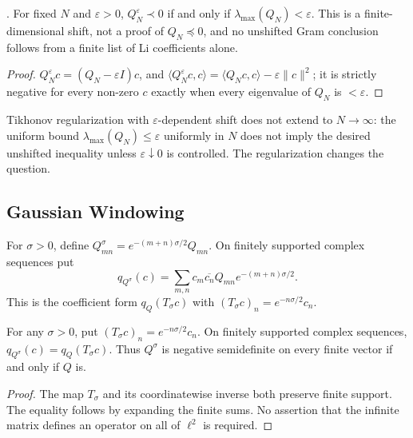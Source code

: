 \begin{proposition}
\label{v4-arith:w7-h:prop:tikhonov-pos}
\ClaimStatusProvedHere. For fixed \(N\) and \(\varepsilon>0\),
\(Q_{N}^{\varepsilon}\prec0\) if and only if
\(\lambda_{\max}(Q_{N})<\varepsilon\). This is a finite-dimensional
shift, not a proof of \(Q_{N}\preceq0\), and no unshifted Gram conclusion follows from a finite list of
Li coefficients alone.
\end{proposition}

\begin{proof}
\(Q_{N}^{\varepsilon}c=(Q_{N}-\varepsilon I)c\), and
\(\langle Q_{N}^{\varepsilon}c,c\rangle=\langle Q_{N}c,c\rangle-\varepsilon\|c\|^{2}\);
it is strictly negative for every non-zero \(c\) exactly when every
eigenvalue of \(Q_N\) is \(<\varepsilon\).
\end{proof}

\begin{remark}
\label{v4-arith:w7-h:rem:tikhonov-ceiling}
Tikhonov regularization with \(\varepsilon\)-dependent shift does not
extend to \(N\to\infty\): the uniform bound
\(\lambda_{\max}(Q_{N})\leq\varepsilon\) uniformly in \(N\) does not imply
the desired unshifted inequality unless \(\varepsilon\downarrow0\) is
controlled. The regularization changes the question.
\end{remark}

\subsection{Gaussian Windowing}
\label{v4-arith:w7-h:regularizations:gaussian}

\begin{definition}
\label{v4-arith:w7-h:def:gaussian-window}
For $\sigma>0$, define $Q^\sigma_{mn}=e^{-(m+n)\sigma/2}Q_{mn}$.
On finitely supported complex sequences put
\[
 q_{Q^\sigma}(c)=\sum_{m,n}c_m\overline{c_n}
                 Q_{mn}e^{-(m+n)\sigma/2}.
\]
This is the coefficient form $q_Q(T_\sigma c)$ with
$(T_\sigma c)_n=e^{-n\sigma/2}c_n$.
\end{definition}

\begin{lemma}
\label{v4-arith:w7-h:lem:gaussian-no-help}
For any $\sigma>0$, put $(T_\sigma c)_n=e^{-n\sigma/2}c_n$.
On finitely supported complex sequences,
$q_{Q^\sigma}(c)=q_Q(T_\sigma c)$.
Thus $Q^\sigma$ is negative semidefinite on every finite vector
if and only if $Q$ is.
\end{lemma}
\begin{proof}
The map $T_\sigma$ and its coordinatewise inverse both preserve
finite support. The equality follows by expanding the finite sums.
No assertion that the infinite matrix defines an operator on all
of $\ell^2$ is required.
\end{proof}

